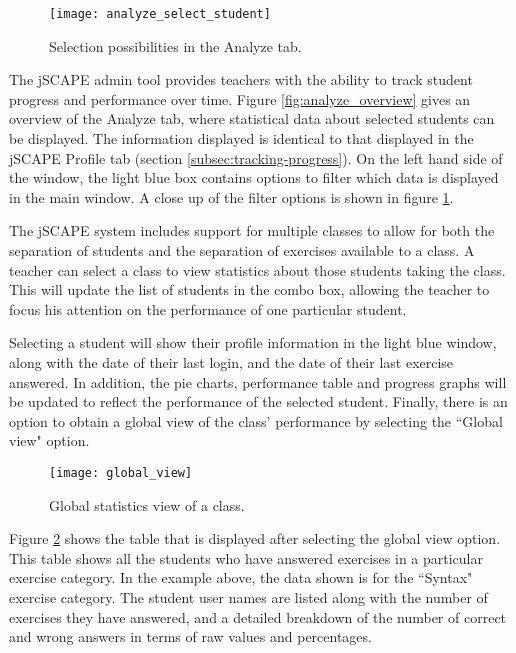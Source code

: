 \begin{figure}[H]
\centering
\texttt{[image: analyze\_select\_student]}
\caption{Selection possibilities in the Analyze tab.}
\label{fig:analyze_select_student}
\end{figure}

The jSCAPE admin tool provides teachers with the ability to track student progress and performance over time. Figure \ref{fig:analyze_overview} gives an overview of the Analyze tab, where statistical data about selected students can be displayed. The information displayed is identical to that displayed in the jSCAPE Profile tab (section \ref{subsec:tracking-progress}). On the left hand side of the window, the light blue box contains options to filter which data is displayed in the main window. A close up of the filter options is shown in figure \ref{fig:analyze_select_student}.\newline

The jSCAPE system includes support for multiple classes to allow for both the separation of students and the separation of exercises available to a class. A teacher can select a class to view statistics about those students taking the class. This will update the list of students in the combo box, allowing the teacher to focus his attention on the performance of one particular student. \newline

Selecting a student will show their profile information in the light blue window, along with the date of their last login, and the date of their last exercise answered. In addition, the pie charts, performance table and progress graphs will be updated to reflect the performance of the selected student. Finally, there is an option to obtain a global view of the class' performance by selecting the ``Global view" option. 

\begin{figure}[H]
\centering
\texttt{[image: global\_view]}
\caption{Global statistics view of a class.}
\label{fig:global_view}
\end{figure}

Figure \ref{fig:global_view} shows the table that is displayed after selecting the global view option. This table shows all the students who have answered exercises in a particular exercise category. In the example above, the data shown is for the ``Syntax" exercise category. The student user names are listed along with the number of exercises they have answered, and a detailed breakdown of the number of correct and wrong answers in terms of raw values and percentages. \newline

